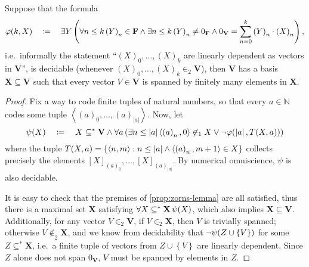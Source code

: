 \documentclass[11pt]{article}
\theoremstyle{plain}
\theoremstyle{definition}
\newcommand{\tuple}[1]{\left\langle #1 \right\rangle}
\begin{document}
\begin{corollary}
    Suppose that the formula
    \[\varphi\mleft(k, X\mright) \quad \coloneqq \quad \exists Y \left(\forall n \leq k \left(Y\right)_n \in \mathbf{F} \land \exists n \leq k \left(Y\right)_n \neq 0_\mathbf{F} \land 0_\mathbf{V} = \sum_{n = 0}^k \left(Y\right)_n \cdot \left(X\right)_n\right),\]
    i.e.\ informally the statement ``$\left(X\right)_0, \ldots, \left(X\right)_k$ are linearly dependent as vectors in $\mathbf{V}$'', is decidable (whenever $\left(X\right)_0, \ldots, \left(X\right)_k \in_2 \mathbf{V}$), then $\mathbf{V}$ has a basis $\mathbf{X} \subseteq \mathbf{V}$ such that every vector $V \in \mathbf{V}$ is spanned by finitely many elements in $\mathbf{X}$.
\end{corollary}

\begin{proof}
    Fix a way to code finite tuples of natural numbers, so that every $a \in \mathbb{N}$ codes some tuple $\tuple{\left(a\right)_0, \ldots, \left(a\right)_{\left|a\right|}}$. Now, let
    \[\psi\mleft(X\mright) \quad \coloneqq \quad X \subseteq^* \mathbf{V} \land \forall a \left(\exists n \leq \left|a\right| \tuple{\left(a\right)_n, 0} \not\in_1 X \lor \neg \varphi\mleft(\left|a\right|, T\mleft(X, a\mright)\mright)\right)\]
    where the tuple $T\mleft(X, a\mright) = \left\{\tuple{n, m} : n \leq \left|a\right| \land \tuple{\left(a\right)_n, m + 1} \in X\right\}$ collects precisely the elements $\left[X\right]_{\left(a\right)_0}, \ldots, \left[X\right]_{\left(a\right)_{\left|a\right|}}$. By numerical omniscience, $\psi$ is also decidable.

    It is easy to check that the premises of \autoref{prop:zorns-lemma} are all satisfied, thus there is a maximal set $\mathbf{X}$ satisfying $\forall X \subseteq^* \mathbf{X} \, \psi\mleft(X\mright)$, which also implies $\mathbf{X} \subseteq \mathbf{V}$. Additionally, for any vector $V \in_2 \mathbf{V}$, if $V \in_2 \mathbf{X}$, then $V$ is trivially spanned; otherwise $V \not\in_2 \mathbf{X}$, and we know from decidability that $\neg \psi\mleft(Z \cup \left\{V\right\}\mright)$ for some $Z \subseteq^* \mathbf{X}$, i.e.\ a finite tuple of vectors from $Z \cup \left\{V\right\}$ are linearly dependent. Since $Z$ alone does not span $0_\mathbf{V}$, $V$ must be spanned by elements in $Z$.
\end{proof}
\end{document}
